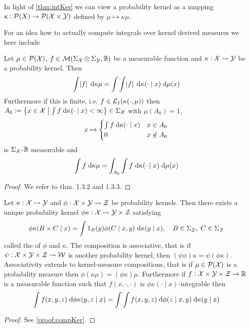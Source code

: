 \begin{rem}
  In light of \cref{thm:intKer} we can view a probability kernel as a mapping
  $\kappa : \mathcal{P}(X) \to \mathcal{P}(\mathcal{X} \times \mathcal{Y})$
  defined by $\mu \mapsto \kappa \mu$.
  \label{rem:measureMap}
\end{rem}

For an idea how to actually compute integrals over kernel derived measures
we here include
\begin{thm}
  Let $\mu \in \mathcal{P}(\mathcal{X})$,
  $f \in \mathcal{M}(\Sigma_\mathcal{X} \otimes \Sigma_\mathcal{Y}, \mathbb{B})$
  be a measurable function and
  $\kappa : \mathcal{X} \leadsto \mathcal{Y}$ be a probability kernel.
  Then
  \[ \int \abs{f} \; \mathrm{d} \kappa \mu
  = \int \int \abs{f} \; \mathrm{d} \kappa(\cdot \mid x) \; \mathrm{d} \mu(x) \]
  Furthermore if this is finite, i.e. $f \in \mathcal{L}_1(\kappa(\cdot, \mu))$
  then $A_0 \vcentcolon= \left\{ x \in \mathcal{X} \;\middle\vert\;
    \int f \; \mathrm{d} \kappa(\cdot \mid x) < \infty \right\}
  \in \Sigma_\mathcal{X}$
  with $\mu(A_0) = 1$, 
  \[ x \mapsto \begin{cases}
      \int f \; \mathrm{d} \kappa(\cdot \mid x) & x \in A_0
      \\ 0 & x \not\in A_0
  \end{cases} \]
  is $\Sigma_\mathcal{X}$-$\mathbb{B}$ measurable and
  \[ \int f \; \mathrm{d} \kappa \mu
  = \int_{A_0} \int f \; \mathrm{d} \kappa(\cdot \mid x) \; \mathrm{d} \mu(x) \]  
  \label{thm:extTonFub}
\end{thm}
\begin{proof}
  We refer to  thm. 1.3.2 and 1.3.3.
\end{proof}

\begin{prop}
  Let $\kappa : \mathcal{X} \leadsto \mathcal{Y}$ and
  $\phi : \mathcal{X} \times \mathcal{Y} \leadsto \mathcal{Z}$ be probability kernels.
  Then there exists a unique probability kernel
  $\phi \kappa: \mathcal{X} \leadsto \mathcal{Y} \times \mathcal{Z}$
  satisfying
  \[ \phi \kappa(B \times C \mid x) = \int 1_B(y) \phi(C \mid x, y)
  \; \mathrm{d} \kappa(y \mid x), \quad B \in \Sigma_\mathcal{Y}, \; C \in \Sigma_\mathcal{Z} \]
  called the  of $\phi$ and $\kappa$.
  The composition is associative,
  that is if $\psi : \mathcal{X} \times \mathcal{Y} \times \mathcal{Z}
  \leadsto \mathcal{W}$
  is another probability kernel, then
  $(\psi \phi) \kappa = \psi (\phi \kappa)$.
  Associativity extends to kernel-measure compositions, that is if
  $\mu \in \mathcal{P}(\mathcal{X})$ is a probability measure then
  $\phi (\kappa \mu) = (\phi \kappa) \mu$.
  Furthermore if $f : \mathcal{X} \times \mathcal{Y} \times \mathcal{Z} \to \mathbb{R}$ is
  a measurable function such that $f(x, \cdot, \cdot)$ is
  $\phi \kappa( \cdot \mid x )$-integrable then
  \[ \int f(x, y, z) \; \mathrm{d} \phi \kappa (y, z \mid x)
  = \int \int f(x, y, z) \; \mathrm{d} \phi(z \mid x, y) \; \mathrm{d} \kappa(y \mid x) \]
  \label{prop:compKer}
\end{prop}
\begin{proof}
  See \cref{proof:compKer}.
\end{proof}


